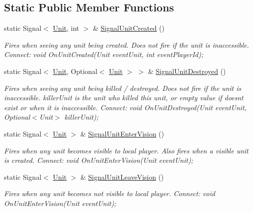 \subsection*{Static Public Member Functions}
\begin{DoxyCompactItemize}
\item 
static Signal$<$ \hyperlink{class_s_c2_a_p_i_1_1_unit}{Unit}, int $>$ \& \hyperlink{class_s_c2_a_p_i_1_1_unit_ac7be2fb4fba92ea3bad9c08dc5691baa}{Signal\+Unit\+Created} ()
\begin{DoxyCompactList}\small\item\em Fires when seeing any unit being created. Does not fire if the unit is inaccessible. Connect\+: void On\+Unit\+Created(\+Unit event\+Unit, int event\+Player\+Id); \end{DoxyCompactList}\item 
static Signal$<$ \hyperlink{class_s_c2_a_p_i_1_1_unit}{Unit}, Optional$<$ \hyperlink{class_s_c2_a_p_i_1_1_unit}{Unit} $>$ $>$ \& \hyperlink{class_s_c2_a_p_i_1_1_unit_af46f80064fb5835c6c71156cfea3a1d0}{Signal\+Unit\+Destroyed} ()
\begin{DoxyCompactList}\small\item\em Fires when seeing any unit being killed / destroyed. Does not fire if the unit is inaccessible. killer\+Unit is the unit who killed this unit, or empty value if doesn\textquotesingle{}t exist or when it is inaccessible. Connect\+: void On\+Unit\+Destroyed(\+Unit event\+Unit, Optional$<$\+Unit$>$ killer\+Unit); \end{DoxyCompactList}\item 
static Signal$<$ \hyperlink{class_s_c2_a_p_i_1_1_unit}{Unit} $>$ \& \hyperlink{class_s_c2_a_p_i_1_1_unit_a1f959d229372b216839c019dc406c4d5}{Signal\+Unit\+Enter\+Vision} ()
\begin{DoxyCompactList}\small\item\em Fires when any unit becomes visible to local player. Also fires when a visible unit is created. Connect\+: void On\+Unit\+Enter\+Vision(\+Unit event\+Unit); \end{DoxyCompactList}\item 
static Signal$<$ \hyperlink{class_s_c2_a_p_i_1_1_unit}{Unit} $>$ \& \hyperlink{class_s_c2_a_p_i_1_1_unit_aaf7c098eff8a4ac7a8b8e02f13f4048e}{Signal\+Unit\+Leave\+Vision} ()
\begin{DoxyCompactList}\small\item\em Fires when any unit becomes not visible to local player. Connect\+: void On\+Unit\+Enter\+Vision(\+Unit event\+Unit); \end{DoxyCompactList}\end{DoxyCompactItemize}
